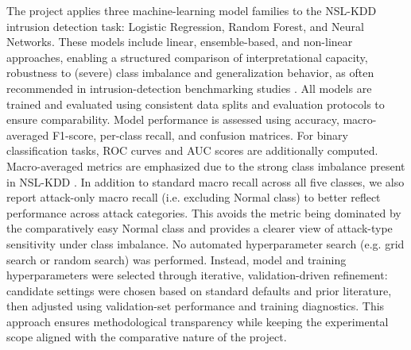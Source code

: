The project applies three machine-learning model families to the NSL-KDD intrusion detection task: Logistic Regression, Random Forest, and Neural Networks. 
These models include linear, ensemble-based, and non-linear approaches, enabling a structured comparison of interpretational capacity, robustness to (severe) class imbalance 
and generalization behavior, as often recommended in intrusion-detection benchmarking studies \cite{abrar2020machine, hegde2024intrusion, hong2021machine}. All models are trained 
and evaluated using consistent data splits and evaluation protocols to ensure comparability. Model performance is assessed using accuracy, macro-averaged F1-score, per-class recall, 
and confusion matrices. For binary classification tasks, ROC curves and AUC scores are additionally computed. Macro-averaged metrics are emphasized due to the strong class imbalance 
present in NSL-KDD \cite{abrar2020machine, tavallaee2009detailed}. In addition to standard macro recall across all five classes, we also report attack-only macro recall 
(i.e. excluding Normal class) to better reflect performance across attack categories. This avoids the metric being dominated by the comparatively easy Normal class and provides a 
clearer view of attack-type sensitivity under class imbalance. No automated hyperparameter search (e.g. grid search or random search) was performed. Instead, model and training 
hyperparameters were selected through iterative, validation-driven refinement: candidate settings were chosen based on standard defaults and prior literature, then adjusted using 
validation-set performance and training diagnostics. This approach ensures methodological transparency while keeping the experimental scope aligned with the comparative nature of the project.

